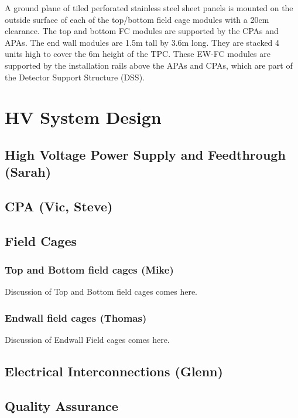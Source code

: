 A ground plane of tiled perforated stainless steel sheet panels is mounted on the outside surface of each of the top/bottom field cage modules with a 20cm clearance. The top and bottom  FC modules are supported by the CPAs and APAs. The end wall modules are 1.5m tall by 3.6m long. They are stacked 4 units high to cover the 6m height of the TPC.  These EW-FC modules are supported by the installation rails above  the APAs and CPAs, which are part of the Detector Support Structure (DSS). 




\section{HV System Design}
\label{sec:fdsp-hv-design}

\subsection {High Voltage Power Supply and Feedthrough (Sarah)}
\subsection{CPA (Vic, Steve)}
\subsection{Field Cages}


\subsubsection{Top and Bottom field cages (Mike)}
Discussion of Top and Bottom field cages comes here.
\subsubsection{ Endwall field cages (Thomas)}
Discussion of Endwall Field cages comes here.


\subsection{Electrical Interconnections (Glenn)}


\subsection{Quality Assurance}
\label{sec:fdsp-hv-qa}

